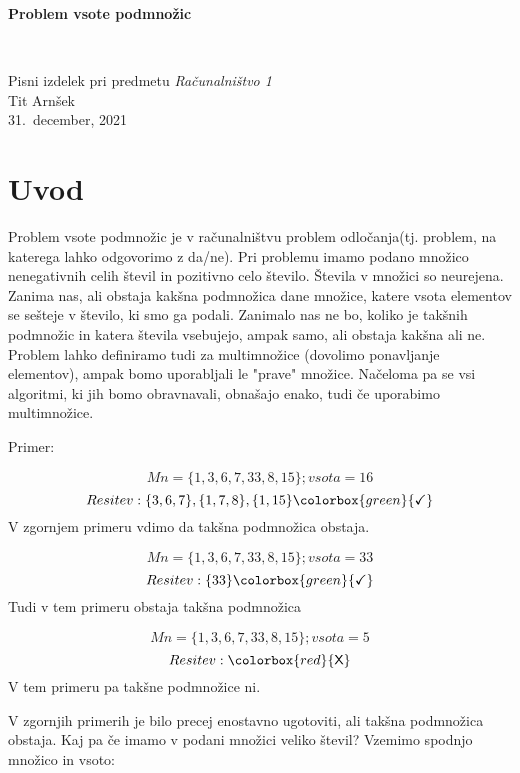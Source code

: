 \documentclass[12pt]{article}
\begin{document}
\thispagestyle{empty}
\begin{center}
\begin{Large}
{\bf Problem vsote podmnožic}
\end{Large}
\\[5mm]
\begin{large}
Pisni izdelek pri predmetu {\em Računalništvo 1}
\\[5mm]
{\sc Tit Arnšek}
\\[10mm]
31.~december, 2021
\end{large}

\end{center}

\newpage

\tableofcontents
\newpage
\listoffigures

\newpage
\section{Uvod}
Problem vsote podmnožic je v računalništvu problem odločanja(tj. problem, na katerega
lahko odgovorimo z da/ne).\newline
Pri problemu imamo podano množico nenegativnih celih števil in pozitivno  celo število. Števila v množici so neurejena.  
Zanima nas, ali obstaja kakšna podmnožica dane množice, katere vsota elementov se sešteje v  število, ki smo ga podali.
Zanimalo nas ne bo, koliko je takšnih podmnožic in katera števila vsebujejo, ampak samo, ali obstaja kakšna ali ne. \newline
Problem lahko definiramo tudi za multimnožice (dovolimo ponavljanje elementov), ampak bomo uporabljali le "prave" množice. 
Načeloma pa se vsi algoritmi, ki jih bomo obravnavali, obnašajo enako, tudi če uporabimo multimnožice.

 Primer:

\[ Mn = \{1,3,6,7,33,8,15\}; vsota = 16\]
 $$Resitev: \{3,6,7\},\{1,7,8\},\{1,15\}  \colorbox{green}{\checkmark}$$ 
V zgornjem primeru vdimo da takšna podmnožica obstaja. 

 $$Mn = \{1,3,6,7,33,8,15\}; vsota = 33$$
 $$Resitev: \{33\} \colorbox{green}{\checkmark}$$ 
Tudi v tem primeru obstaja takšna podmnožica

 $$Mn = \{1,3,6,7,33,8,15\}; vsota = 5   $$
 $$Resitev: \colorbox{red}{\text{\sffamily X}}$$ 
 V tem primeru pa takšne podmnožice ni.
 \newline

 V zgornjih primerih je bilo precej enostavno ugotoviti, ali takšna
 podmnožica obstaja. Kaj pa če imamo v podani množici veliko števil?\newline
Vzemimo spodnjo množico in vsoto:
\end{document}
